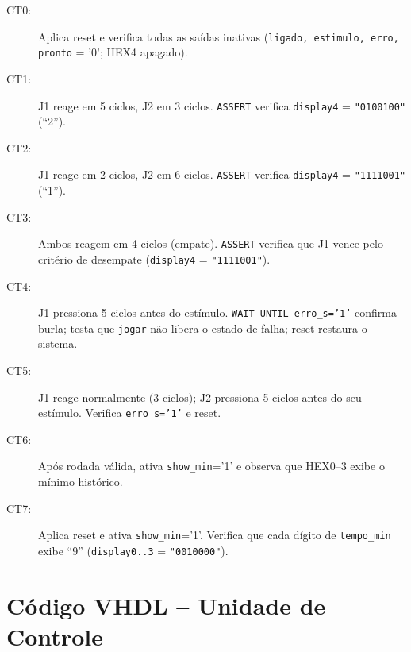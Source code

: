 \documentclass[12pt,a4paper]{article}
\begin{document}
\begin{description}
  \item[CT0:] Aplica reset e verifica todas as saídas inativas
    (\texttt{ligado, estimulo, erro, pronto} = '0'; HEX4 apagado).
  \item[CT1:] J1 reage em 5 ciclos, J2 em 3 ciclos.
    \texttt{ASSERT} verifica \texttt{display4} = \texttt{"0100100"} (``2'').
  \item[CT2:] J1 reage em 2 ciclos, J2 em 6 ciclos.
    \texttt{ASSERT} verifica \texttt{display4} = \texttt{"1111001"} (``1'').
  \item[CT3:] Ambos reagem em 4 ciclos (empate).
    \texttt{ASSERT} verifica que J1 vence pelo critério de desempate
    (\texttt{display4} = \texttt{"1111001"}).
  \item[CT4:] J1 pressiona 5 ciclos antes do estímulo. \texttt{WAIT UNTIL
    erro\_s='1'} confirma burla; testa que \texttt{jogar} não libera o
    estado de falha; reset restaura o sistema.
  \item[CT5:] J1 reage normalmente (3 ciclos); J2 pressiona 5 ciclos antes
    do seu estímulo. Verifica \texttt{erro\_s='1'} e reset.
  \item[CT6:] Após rodada válida, ativa \texttt{show\_min}='1' e observa
    que HEX0--3 exibe o mínimo histórico.
  \item[CT7:] Aplica reset e ativa \texttt{show\_min}='1'. Verifica que
    cada dígito de \texttt{tempo\_min} exibe ``9''
    (\texttt{display0..3} = \texttt{"0010000"}).
\end{description}

\section{Código VHDL -- Unidade de Controle}
\end{document}
